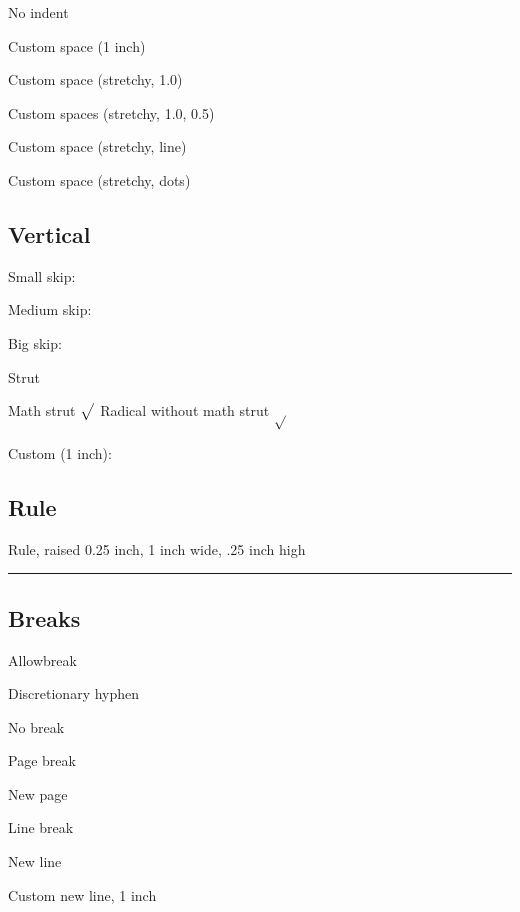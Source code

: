 \documentclass{article}
\begin{document}
\noindent No indent

Custom space (1 inch) \rbrack \hspace{1in}\lbrack

Custom space (stretchy, 1.0) \rbrack \hfill \lbrack

Custom spaces (stretchy, 1.0, 0.5) \rbrack \hfill \lbrack \rbrack {}\lbrack

Custom space (stretchy, line) \rbrack \hrulefill \lbrack

Custom space (stretchy, dots) \rbrack \dotfill \lbrack

\subsection{Vertical}

Small skip:\smallskip

Medium skip: \medskip

Big skip: \bigskip

Strut \lbrack \strut \rbrack

Math strut $\sqrt{\mathstrut }$ Radical without math strut $\sqrt{}$

Custom (1 inch): \vspace{1in}

\subsection{Rule}

Rule, raised 0.25 inch, 1 inch wide, .25 inch high \rule[0.25in]{1in}{0.25in}

\subsection{Breaks}

Allowbreak \rbrack \allowbreak \lbrack

Discretionary hyphen \rbrack \-\lbrack

No break \rbrack \nolinebreak \lbrack

Page break\rbrack \pagebreak \lbrack

New page \rbrack \newpage

\lbrack

Line break \rbrack \linebreak \lbrack

New line \rbrack \newline
\lbrack

Custom new line, 1 inch\rbrack \\[1in]
\lbrack
\end{document}

